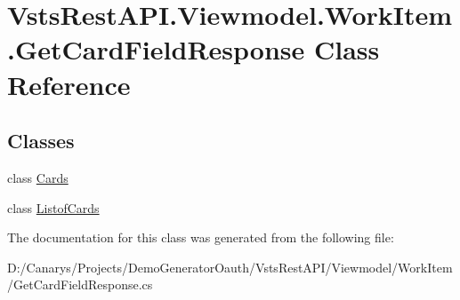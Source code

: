 \hypertarget{class_vsts_rest_a_p_i_1_1_viewmodel_1_1_work_item_1_1_get_card_field_response}{}\section{Vsts\+Rest\+A\+P\+I.\+Viewmodel.\+Work\+Item.\+Get\+Card\+Field\+Response Class Reference}
\label{class_vsts_rest_a_p_i_1_1_viewmodel_1_1_work_item_1_1_get_card_field_response}
\subsection*{Classes}
\begin{DoxyCompactItemize}
\item 
class \mbox{\hyperlink{class_vsts_rest_a_p_i_1_1_viewmodel_1_1_work_item_1_1_get_card_field_response_1_1_cards}{Cards}}
\item 
class \mbox{\hyperlink{class_vsts_rest_a_p_i_1_1_viewmodel_1_1_work_item_1_1_get_card_field_response_1_1_listof_cards}{Listof\+Cards}}
\end{DoxyCompactItemize}


The documentation for this class was generated from the following file\+:\begin{DoxyCompactItemize}
\item 
D\+:/\+Canarys/\+Projects/\+Demo\+Generator\+Oauth/\+Vsts\+Rest\+A\+P\+I/\+Viewmodel/\+Work\+Item/Get\+Card\+Field\+Response.\+cs\end{DoxyCompactItemize}

